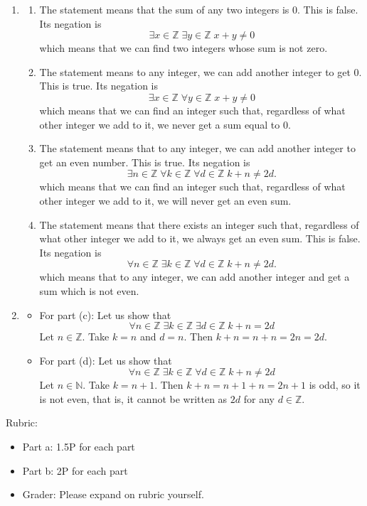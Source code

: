 \documentclass{article}
\newcommand{\Z}{\mathbb{Z}}
\newcommand{\N}{\mathbb{N}}
\theoremstyle{definition}
\begin{document}
\begin{solution}
\begin{enumerate}
	\item 
	\begin{enumerate}
		\item The statement means that the sum of any two integers is 0. This is false. Its negation is
		\[
		\exists x \in \Z \; \exists y \in \Z \; x + y \neq 0
		\]
		which means that we can find two integers whose sum is not zero.
		
		\item The statement means to any integer, we can add another integer to get 0. This is true. Its negation is
		\[
		\exists x \in \Z \; \forall y \in \Z \; x + y \neq 0
		\]
		which means that we can find an integer such that, regardless of what other integer we add to it, we never get a sum equal to 0.
		
		
		\item The statement means that to any integer, we can add another integer to get an even number. This is true. Its negation is
		\[
		\exists n \in \Z \; \forall k \in \Z \; \forall d \in \Z \; k + n \neq 2d.
		\]
		which means that we can find an integer such that, regardless of what other integer we add to it, we will never get an  even sum.
		
		\item The statement means that there exists an integer such that, regardless of what other integer we add to it, we always get an even sum. This is false. Its negation is
		\[
		\forall n \in \Z \; \exists k \in \Z \; \forall d \in \Z \; k + n \neq 2d.
		\]
		which means that to any integer, we can add another integer and get a sum which is not even.
		
	\end{enumerate}
	\item \begin{itemize}
		\item For part (c): Let us show that
		\[
		\forall n \in \Z \; \exists k \in \Z \; \exists d \in \Z \; k + n = 2d
		\]
		Let $n \in \Z$. Take $k = n$ and $d = n$. Then $k+n = n + n = 2n = 2d$.
		
		\item For part (d): Let us show that
		\[
		\forall n \in \Z \; \exists k \in \Z \; \forall d \in \Z \; k + n \neq 2d
		\]
		Let $n \in \N$. Take $k = n + 1$. Then $k + n = n+1+n = 2n + 1$ is odd, so it is not even, that is, it cannot be written as $2d$ for any $d \in \Z$.
		
	\end{itemize}
	
\end{enumerate}

{\color{red} Rubric:
\begin{itemize}
\item Part a: 1.5P for each part
\item Part b: 2P for each part
\item Grader: Please expand on rubric yourself.
\end{itemize}}
\end{solution}
\end{document}
